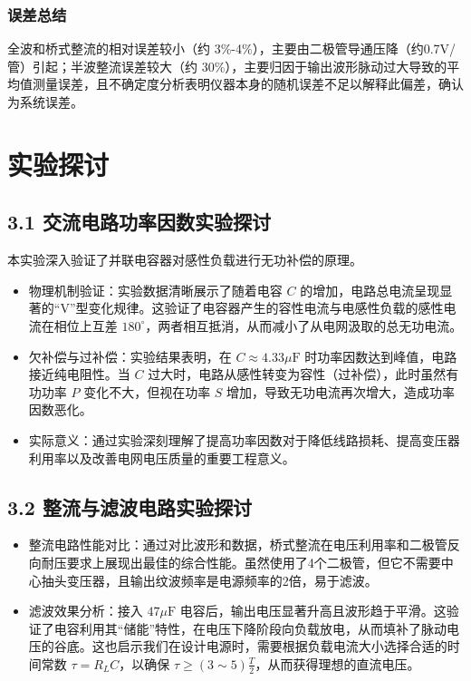 \documentclass[]{../../templates/Report}%
\begin{document}
\begin{fullreportonly}
    \subsubsection{误差总结}
    全波和桥式整流的相对误差较小（约 3\%-4\%），主要由二极管导通压降（约0.7V/管）引起；半波整流误差较大（约 30\%），主要归因于输出波形脉动过大导致的平均值测量误差，且不确定度分析表明仪器本身的随机误差不足以解释此偏差，确认为系统误差。


    \section{实验探讨}

    \subsection{3.1 交流电路功率因数实验探讨}
    本实验深入验证了并联电容器对感性负载进行无功补偿的原理。
    \begin{itemize}
        \item 物理机制验证：实验数据清晰展示了随着电容 $C$ 的增加，电路总电流呈现显著的“V”型变化规律。这验证了电容器产生的容性电流与电感性负载的感性电流在相位上互差 $180^\circ$，两者相互抵消，从而减小了从电网汲取的总无功电流。
        \item 欠补偿与过补偿：实验结果表明，在 $C \approx 4.33\mu\text{F}$ 时功率因数达到峰值，电路接近纯电阻性。当 $C$ 过大时，电路从感性转变为容性（过补偿），此时虽然有功功率 $P$ 变化不大，但视在功率 $S$ 增加，导致无功电流再次增大，造成功率因数恶化。
        \item 实际意义：通过实验深刻理解了提高功率因数对于降低线路损耗、提高变压器利用率以及改善电网电压质量的重要工程意义。
    \end{itemize}

    \subsection{3.2 整流与滤波电路实验探讨}
    \begin{itemize}
        \item 整流电路性能对比：通过对比波形和数据，桥式整流在电压利用率和二极管反向耐压要求上展现出最佳的综合性能。虽然使用了4个二极管，但它不需要中心抽头变压器，且输出纹波频率是电源频率的2倍，易于滤波。
        \item 滤波效果分析：接入 $47\mu\text{F}$ 电容后，输出电压显著升高且波形趋于平滑。这验证了电容利用其“储能”特性，在电压下降阶段向负载放电，从而填补了脉动电压的谷底。这也启示我们在设计电源时，需要根据负载电流大小选择合适的时间常数 $\tau = R_L C$，以确保 $\tau \geq (3\sim5) \frac{T}{2}$，从而获得理想的直流电压。
    \end{itemize}


\end{fullreportonly}
\end{document}
